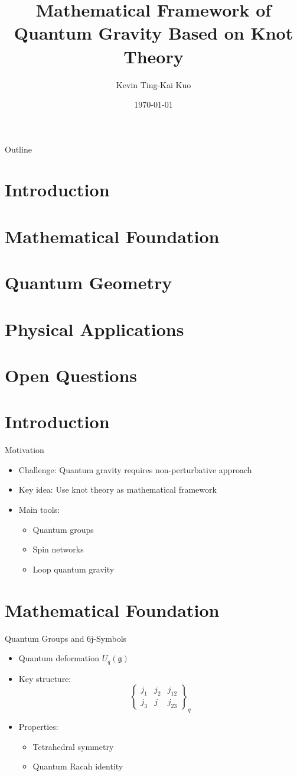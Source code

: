 \documentclass{beamer}
\title{Mathematical Framework of Quantum Gravity Based on Knot Theory}
\author{Kevin Ting-Kai Kuo}
\date{\today}
\begin{document}
\frame{\titlepage}

\begin{frame}{Outline}
\section{Introduction}
\section{Mathematical Foundation}
\section{Quantum Geometry}
\section{Physical Applications}
\section{Open Questions}
\tableofcontents
\end{frame}

\section{Introduction}
\begin{frame}{Motivation}
\begin{itemize}
\item Challenge: Quantum gravity requires non-perturbative approach
\item Key idea: Use knot theory as mathematical framework
\item Main tools:
    \begin{itemize}
    \item Quantum groups
    \item Spin networks
    \item Loop quantum gravity
    \end{itemize}
\end{itemize}
\end{frame}

\section{Mathematical Foundation}
\begin{frame}{Quantum Groups and 6j-Symbols}
\begin{itemize}
\item Quantum deformation $U_q(\mathfrak{g})$
\item Key structure:
\[
\begin{Bmatrix} 
j_1 & j_2 & j_{12} \\
j_3 & j & j_{23}
\end{Bmatrix}_q
\]
\item Properties:
    \begin{itemize}
    \item Tetrahedral symmetry
    \item Quantum Racah identity
    \end{itemize}
\end{itemize}
\end{frame}
\end{document}
